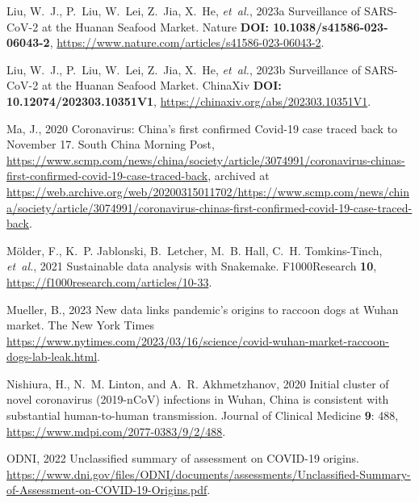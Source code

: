 \documentclass[9pt,twocolumn,twoside]{gsajnl_modified}
\begin{document}
{\begin{thebibliography}{44}
{Liu, W.~J., P.~Liu, W.~Lei, Z.~Jia, X.~He, {\em et~al.\/}}, 2023{a}
  {Surveillance of SARS-CoV-2 at the Huanan Seafood Market}. Nature {\bf DOI:
  10.1038/s41586-023-06043-2},
  \url{https://www.nature.com/articles/s41586-023-06043-2}.

{Liu, W.~J., P.~Liu, W.~Lei, Z.~Jia, X.~He, {\em et~al.\/}}, 2023{b}
  {Surveillance of SARS-CoV-2 at the Huanan Seafood Market}. ChinaXiv {\bf DOI:
  10.12074/202303.10351V1}, \url{https://chinaxiv.org/abs/202303.10351V1}.

{Ma, J.}, 2020 {Coronavirus: China’s first confirmed Covid-19 case traced
  back to November 17}. South China Morning Post,
  \url{https://www.scmp.com/news/china/society/article/3074991/coronavirus-chinas-first-confirmed-covid-19-case-traced-back},
  archived at
  \url{https://web.archive.org/web/20200315011702/https://www.scmp.com/news/china/society/article/3074991/coronavirus-chinas-first-confirmed-covid-19-case-traced-back}.

{M{\"o}lder, F., K.~P. Jablonski, B.~Letcher, M.~B. Hall, C.~H. Tomkins-Tinch,
  {\em et~al.\/}}, 2021 Sustainable data analysis with {Snakemake}.
  F1000Research {\bf 10}, \url{https://f1000research.com/articles/10-33}.

{Mueller, B.}, 2023 New data links pandemic’s origins to raccoon dogs at
  {Wuhan} market. The New York Times
  \url{https://www.nytimes.com/2023/03/16/science/covid-wuhan-market-raccoon-dogs-lab-leak.html}.

{Nishiura, H., N.~M. Linton, {\rm and} A.~R. Akhmetzhanov}, 2020 {Initial
  cluster of novel coronavirus (2019-nCoV) infections in Wuhan, China is
  consistent with substantial human-to-human transmission}. Journal of Clinical
  Medicine {\bf 9}: 488, \url{https://www.mdpi.com/2077-0383/9/2/488}.

{{ODNI}}, 2022 Unclassified summary of assessment on {COVID-19} origins.
  \url{https://www.dni.gov/files/ODNI/documents/assessments/Unclassified-Summary-of-Assessment-on-COVID-19-Origins.pdf}.


\end{thebibliography}}
\end{document}
